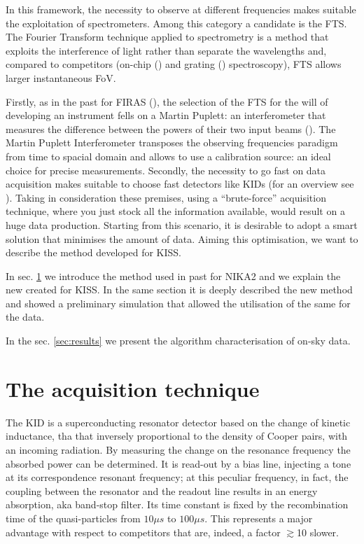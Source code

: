 \documentclass[twocolumn,traditabstract]{aa}\\
\begin{document}
In this framework, the necessity to observe at different frequencies makes suitable the exploitation of spectrometers. Among this category a candidate is the FTS. The Fourier Transform  technique applied to spectrometry is a method that exploits the interference of light rather than separate the wavelengths and, compared to competitors (on-chip (\cite{deshima}) and grating (\cite{grating}) spectroscopy), FTS allows larger instantaneous FoV.

Firstly, as in the past for FIRAS (\cite{FIRAS}), the selection of the FTS for the will of developing an instrument fells on a Martin Puplett: an interferometer that measures the difference between the powers of their two input beams (\cite{mpi}). The Martin Puplett Interferometer transposes the observing frequencies paradigm from time to spacial domain and allows to use a calibration source: an ideal choice for precise measurements.
Secondly, the necessity to go fast on data acquisition makes suitable to choose fast detectors like KIDs (for an overview see \cite{kids}). Taking in consideration these premises, using a ``brute-force'' acquisition technique, where you just stock all the information available, would result on a huge data production. Starting from this scenario, it is desirable to adopt a smart solution that minimises the amount of data.
Aiming this optimisation, we want to describe the method developed for KISS.

In sec. \ref{sec:acq} we introduce the method used in past for NIKA2 and we explain the new created for KISS. In the same section it is deeply described the new method and showed a preliminary simulation that allowed the utilisation of the same for the data.

In the sec. \ref{sec:results} we present the algorithm characterisation of on-sky data.

%


\section{The acquisition technique}
\label{sec:acq}


The KID is a superconducting resonator detector based on the change of kinetic inductance, tha that inversely proportional to the density of Cooper pairs, with an incoming radiation. By measuring the change on the resonance frequency the absorbed power can be determined.  It is read-out by a bias line, injecting a tone at its correspondence resonant frequency; at this peculiar frequency, in fact, the coupling between the resonator and the readout line results in an energy absorption, aka band-stop filter. Its time constant is fixed by the recombination time of the quasi-particles from $10 \mu s$ to $100 \mu s$. This represents a major advantage with respect to competitors that are, indeed, a factor $\gtrsim$10 slower.
\end{document}
